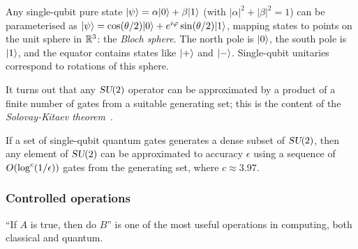 \begin{intuition}
  Any single-qubit pure state $|\psi\rangle=\alpha|0\rangle+\beta|1\rangle$ (with
  $|\alpha|^2+|\beta|^2=1$) can be parameterised as
  $|\psi\rangle=\cos(\theta/2)|0\rangle+e^{i\varphi}\sin(\theta/2)|1\rangle$,
  mapping states to points on the unit sphere in $\mathbb{R}^3$: the \emph{Bloch
    sphere}.  The north pole is $|0\rangle$, the south pole is $|1\rangle$, and
  the equator contains states like $|+\rangle$ and $|-\rangle$.  Single-qubit
  unitaries correspond to rotations of this sphere.

  \begin{center}
  \end{center}
\end{intuition}

It turns out that any $\textsl{SU}(2)$ operator can be approximated by a product of
a finite number of gates from a suitable generating set; this is the content
of the \emph{Solovay-Kitaev theorem}~\cite{SolovayKitaev2006}.

\begin{theorem}\label{thm:SK}
  If a set of single-qubit quantum gates generates a dense subset of $\textsl{SU}(2)$,
  then any element of $\textsl{SU}(2)$ can be approximated to accuracy $\epsilon$
  using a sequence of $O\!\left(\log^c(1/\epsilon)\right)$ gates from the generating
  set, where $c\approx 3.97$.
\end{theorem}

\subsubsection{Controlled operations}\label{subsubsec:controlled}

``If $A$ is true, then do $B$'' is one of the most useful operations in
computing, both classical and quantum.


